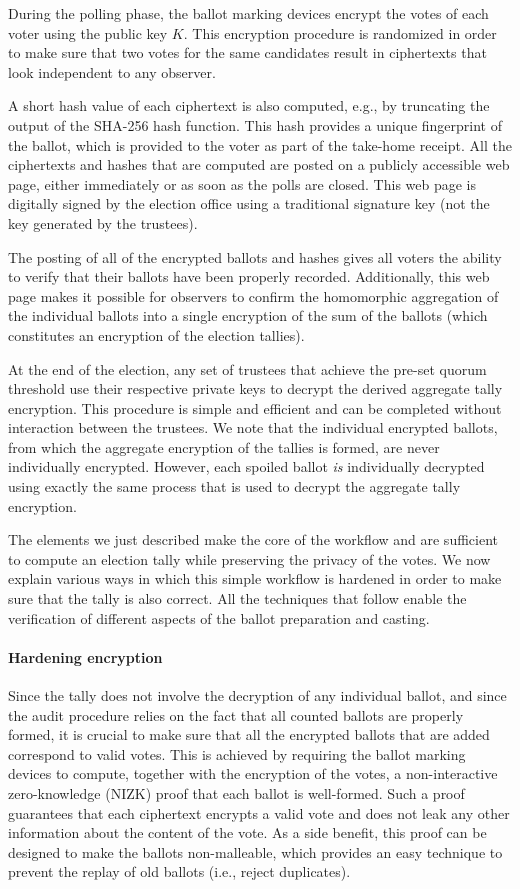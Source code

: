 During the polling phase, the ballot marking devices encrypt the votes
of each voter using the public key $K$. This encryption procedure is
randomized in order to make sure that two votes for the same
candidates result in ciphertexts that look independent to any
observer. 

A short hash value of each ciphertext is also computed, e.g., by
truncating the output of the SHA-256 hash function.  This hash provides
a unique fingerprint of the ballot, which is provided to the voter as
part of the take-home receipt. All the ciphertexts and hashes that are
computed are posted on a publicly accessible web page, either
immediately or as soon as the polls are closed. This web page is
digitally signed by the election office using a traditional signature
key (not the key generated by the trustees).

The posting of all of the encrypted ballots and hashes gives all voters
the ability to verify that their ballots have been properly recorded.
Additionally, this web page makes it possible for observers
to confirm the homomorphic aggregation of the individual ballots into a
single encryption of the sum of the ballots (which constitutes an encryption
of the election tallies). 

At the end of the election, any set of trustees that achieve the pre-set quorum
threshold use their respective private keys to decrypt the derived aggregate tally
encryption.  This procedure is simple and efficient and can be completed
without interaction between the trustees.  We note that the individual 
encrypted ballots, from which the aggregate encryption of the tallies
is formed, are never individually encrypted.  However, each spoiled ballot {\em is}
individually decrypted using exactly the same process that is used to decrypt
the aggregate tally encryption.

The elements we just described make the core of the workflow and are
sufficient to compute an election tally while preserving the privacy
of the votes. We now explain various ways in which this simple
workflow is hardened in order to make sure that the tally is also
correct. All the techniques that follow enable the verification of
different aspects of the ballot preparation and casting.

\paragraph{Hardening encryption}
\label{sec:hardening-encryption}
Since the tally does not involve the decryption of any individual
ballot, and since the audit procedure relies on the fact that all
counted ballots are properly formed, it is crucial to make sure that
all the encrypted ballots that are added correspond to valid votes.
This is achieved by requiring the ballot marking devices to compute,
together with the encryption of the votes, a non-interactive
zero-knowledge (NIZK) proof that each ballot is well-formed. Such a
proof guarantees that each ciphertext encrypts a valid vote and does not
leak any other information about the content of the vote. As a side
benefit, this proof can be designed to make the ballots non-malleable,
which provides an easy technique to prevent the replay of old ballots
(i.e., reject duplicates).

